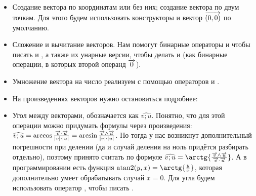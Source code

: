 \begin{itemize}
    \item Создание вектора по координатам или без них; создание вектора по двум точкам. Для этого будем использовать конструкторы и вектор $\overrightarrow{(0, 0)}$ по умолчанию.
    \item Сложение и вычитание векторов. Нам помогут бинарные операторы \lcpp{+} и \lcpp{-} чтобы писать  и , а также их унарные версии, чтобы делать  и  (как бинарные операции, в которых второй операнд $\overrightarrow{0}$).
    \item Умножение вектора на число реализуем с помощью операторов \lcpp{*} и \lcpp{/}.
    \item На произведениях векторов нужно остановиться подробнее:
    \item Угол между векторами, обозначается как $\widehat{v;u}$. Понятно, что для этой операции можно придумать формулы через произведения: $\widehat{v;u} = \arccos{ \frac{\overrightarrow{v} \cdot \overrightarrow{u}}{|v| \cdot |u|} } = \arcsin{ \frac{\overrightarrow{v} \wedge \overrightarrow{u}}{|v| \cdot |u|} }$. Но тогда у нас возникнут дополнительный погрешности при делении (да и случай деления на ноль придётся разбирать отдельно), поэтому принято считать по формуле $\widehat{v;u} = \arctg{ \frac{\v{v} \wedge \v{u}}{\v{v} \cdot \v{u}} }$. А в программировании есть функция $\atantwo(y, x) = \arctg{\frac{y}{x}}$, которая дополнительно умеет обрабатывать случай $x = 0$. Для угла будем использовать оператор \lcpp{^}, чтобы писать .

\end{itemize}
